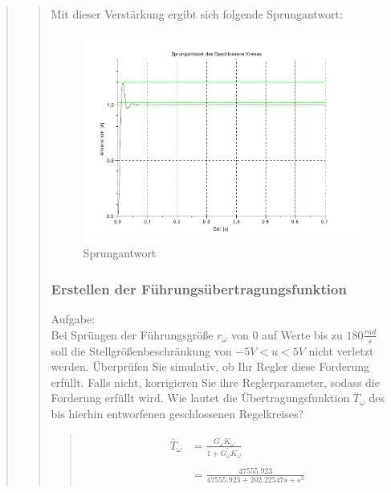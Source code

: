 \begin{quote}
\begin{quote}
        Mit dieser Verstärkung ergibt sich folgende Sprungantwort:
        \begin{figure}[H]
        \centering
            \includegraphics[scale=0.7, trim = 0cm 0cm 0cm 0cm, clip]{./Bilder/Sprungantwortlangsam}
                \caption{Sprungantwort}
        \end{figure}
    
        
        
        \subsubsection{Erstellen der Führungsübertragungsfunktion}
        \label{2d}
        Aufgabe:\\
        Bei Sprüngen der Führungsgröße $r_\omega$ von $0$ auf Werte bis zu $180 \frac{rad}{s}$ soll die
        Stellgrößenbeschränkung von $−5V < u < 5V$ nicht verletzt werden. Überprüfen Sie simulativ, ob Ihr Regler
        diese Forderung erfüllt. Falls nicht, korrigieren Sie ihre Reglerparameter, sodass die Forderung erfüllt wird.
        Wie lautet die Übertragungsfunktion $\overline{T}_\omega$ des bis hierhin entworfenen geschlossenen
        Regelkreises?
        \begin{quote}
            
            \begin{equation*}
            	\begin{split}
            		\overline{T}_\omega &= \frac{G_\omega^{'} K_\omega}{1 + G_\omega^{'} K_\omega}\\ \\
            		&= \frac{47555.923}{47555.923 + 202.22547 s + s^2}
            	\end{split}
            \end{equation*}
        \end{quote}
        

\end{quote}
\end{quote}
